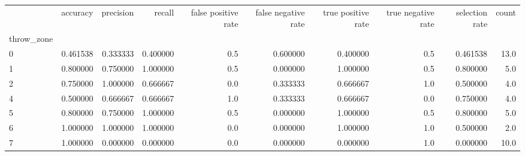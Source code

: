 \begin{tabular}{lrrrrrrrrr}
\toprule
{} &  accuracy &  precision &    recall &  false positive rate &  false negative rate &  true positive rate &  true negative rate &  selection rate &  count \\
throw\_zone &           &            &           &                      &                      &                     &                     &                 &        \\
\midrule
0          &  0.461538 &   0.333333 &  0.400000 &                  0.5 &             0.600000 &            0.400000 &                 0.5 &        0.461538 &   13.0 \\
1          &  0.800000 &   0.750000 &  1.000000 &                  0.5 &             0.000000 &            1.000000 &                 0.5 &        0.800000 &    5.0 \\
2          &  0.750000 &   1.000000 &  0.666667 &                  0.0 &             0.333333 &            0.666667 &                 1.0 &        0.500000 &    4.0 \\
4          &  0.500000 &   0.666667 &  0.666667 &                  1.0 &             0.333333 &            0.666667 &                 0.0 &        0.750000 &    4.0 \\
5          &  0.800000 &   0.750000 &  1.000000 &                  0.5 &             0.000000 &            1.000000 &                 0.5 &        0.800000 &    5.0 \\
6          &  1.000000 &   1.000000 &  1.000000 &                  0.0 &             0.000000 &            1.000000 &                 1.0 &        0.500000 &    2.0 \\
7          &  1.000000 &   0.000000 &  0.000000 &                  0.0 &             0.000000 &            0.000000 &                 1.0 &        0.000000 &   10.0 \\
\bottomrule
\end{tabular}
